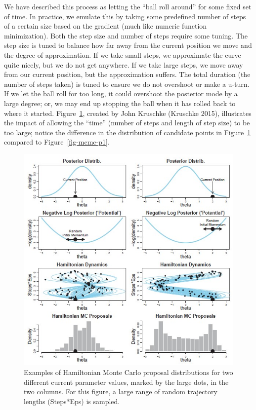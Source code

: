 \documentclass[
  letterpaper,
  DIV=11,
  numbers=noendperiod]{scrreprt}
\theoremstyle{definition}
\theoremstyle{definition}
\theoremstyle{plain}
\theoremstyle{remark}
\begin{document}
We have described this process as letting the ``ball roll around'' for
some fixed set of time. In practice, we emulate this by taking some
predefined number of steps of a certain size based on the gradient (much
like numeric function minimization). Both the step size and number of
steps require some tuning. The step size is tuned to balance how far
away from the current position we move and the degree of approximation.
If we take small steps, we approximate the curve quite nicely, but we do
not get anywhere. If we take large steps, we move away from our current
position, but the approximation suffers. The total duration (the number
of steps taken) is tuned to ensure we do not overshoot or make a u-turn.
If we let the ball roll for too long, it could overshoot the posterior
mode by a large degree; or, we may end up stopping the ball when it has
rolled back to where it started. Figure~\ref{fig-mcmc-p2}, created by
John Kruschke (Kruschke 2015), illustrates the impact of allowing the
``time'' (number of steps and length of step size) to be too large;
notice the difference in the distribution of candidate points in
Figure~\ref{fig-mcmc-p2} compared to Figure~\ref{fig-mcmc-p1}.

\begin{figure}

{\centering \includegraphics{images/Kruschke-Fig2.jpg}

}

\caption{\label{fig-mcmc-p2}Examples of Hamiltonian Monte Carlo proposal
distributions for two different current parameter values, marked by the
large dots, in the two columns. For this figure, a large range of random
trajectory lengths (Steps*Eps) is sampled.}

\end{figure}
\end{document}
